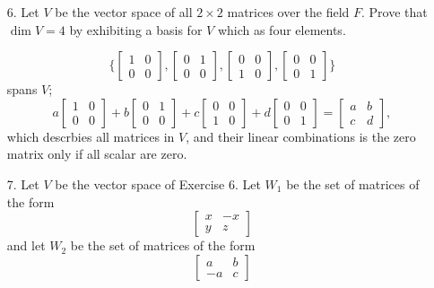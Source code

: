\documentclass{article}
\begin{document}
\begin{enumerate}[listparindent=\parindent]
\item[6.] Let \(V\) be the vector space of all \(2 \times 2\) matrices over the field \(F\).
    Prove that \(\dim V = 4\) by exhibiting a basis for \(V\) which as four elements.

\[
    \{
        \begin{bmatrix} 1 & 0 \\ 0 & 0 \end{bmatrix},
        \begin{bmatrix} 0 & 1 \\ 0 & 0 \end{bmatrix},
        \begin{bmatrix} 0 & 0 \\ 1 & 0 \end{bmatrix},
        \begin{bmatrix} 0 & 0 \\ 0 & 1 \end{bmatrix}
    \}
\]
spans \(V\);
\[
    a \begin{bmatrix} 1 & 0 \\ 0 & 0 \end{bmatrix} +
    b \begin{bmatrix} 0 & 1 \\ 0 & 0 \end{bmatrix} +
    c \begin{bmatrix} 0 & 0 \\ 1 & 0 \end{bmatrix} +
    d \begin{bmatrix} 0 & 0 \\ 0 & 1 \end{bmatrix}
    =
    \begin{bmatrix}
        a & b \\
        c & d
    \end{bmatrix},
\]
which descrbies all matrices in \(V\), and their linear combinations is the zero matrix only if all scalar are zero.

\item[7.] Let \(V\) be the vector space of Exercise 6. Let \(W_1\) be the set of matrices of the form
    \[
        \begin{bmatrix}
            x & -x \\
            y & z
        \end{bmatrix}
    \]
    and let \(W_2\) be the set of matrices of the form
    \[
        \begin{bmatrix}
            a & b \\
            -a & c
        \end{bmatrix}
    \]


\end{enumerate}
\end{document}

